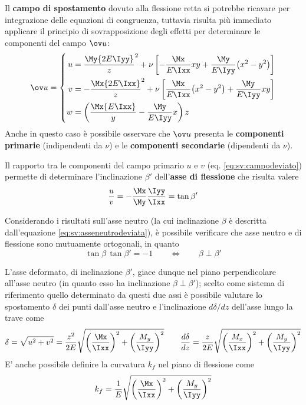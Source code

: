 		Il \textbf{campo di spostamento} dovuto alla flessione retta si potrebbe ricavare per integrazione delle equazioni di congruenza, tuttavia risulta più immediato applicare il principio di sovrapposizione degli effetti per determinare le componenti del campo $\ov u$:
		\begin{equation} \label{eq:sv:campodeviato}
		\ov u = \left\{ 
		\begin{split}
		u &= \frac \My{2E\Iyy}z^2 + \nu \left[ -\frac{\Mx}{E\Ixx}xy + \frac{\My}{E\Iyy}\big(x^2-y^2\big) \right]\\
		v &= -\frac \Mx{2E\Ixx}z^2 + \nu \left[ \frac{\Mx}{E\Ixx}\big(x^2-y^2\big) + \frac{\My}{E\Iyy}xy \right] \\
		w &= \left( \frac \Mx{E\Ixx} y - \frac{\My}{E\Iyy}x \right)z
		\end{split}\right.
		\end{equation}
		Anche in questo caso è possibile osservare che $\ov u$ presenta le \textbf{componenti primarie} (indipendenti da $\nu$) e le \textbf{componenti secondarie} (dipendenti da $\nu$).
		
		\begin{concetto}
			Il rapporto tra le componenti del campo primario $u$ e $v$ (eq. \ref{eq:sv:campodeviato}) permette di determinare l'inclinazione $\beta'$ dell'\textbf{asse di flessione} che risulta valere
			\begin{equation}
				\frac u v = -\frac \Mx \My \frac \Iyy \Ixx = \tan\beta'
			\end{equation}
		\end{concetto}
		\begin{osservazione}
			Considerando i risultati sull'asse neutro (la cui inclinazione $\beta$ è descritta dall'equazione \ref{eq:sv:asseneutrodeviata}), è possibile verificare che asse neutro e di flessione sono mutuamente ortogonali, in quanto
			\[ \tan \beta \, \tan \beta' = -1 \qquad \Leftrightarrow \qquad \beta \perp \beta'  \]
		\end{osservazione}
		L'asse deformato, di inclinazione $\beta'$, giace dunque nel piano perpendicolare all'asse neutro (in quanto esso ha inclinazione $\beta\perp\beta'$); scelto come sistema di riferimento quello determinato da questi due assi è possibile valutare lo spostamento $\delta$ dei punti dall'asse neutro e l'inclinazione $d\delta/dz$ dell'asse lungo la trave come
		\[ \delta = \sqrt{u^2+v^2} = \frac {z^2}{2E} \sqrt{ \left( \frac {\Mx}\Ixx\right)^2 + \left( \frac {M_y}\Iyy\right)^2}\qquad \frac{d\delta}{dz} = \frac z {2E}\sqrt{ \left( \frac {M_x}\Ixx\right)^2 + \left( \frac {M_y}\Iyy\right)^2 } \]
		E' anche possibile definire la curvatura $k_f$ nel piano di flessione come
		\[ k_f = \frac 1 E \sqrt{ \left( \frac {\Mx}\Ixx\right)^2 + \left( \frac {M_y}\Iyy\right)^2} \]
		

